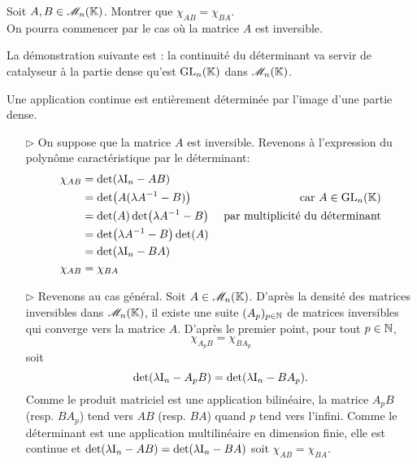 \begin{exercice}
    Soit $A, B \in \mathscr{M}_n(\mathbb{K})$. Montrer que $\chi_{AB}=\chi_{BA}$. \\
    On pourra commencer par le cas où la matrice $A$ est inversible.
\end{exercice}

La démonstration suivante est : la continuité du déterminant va servir de catalyseur à la partie dense qu'est $\mathrm{GL}_n(\mathbb{K})$ dans $\mathscr{M}_n(\mathbb{K})$.
\begin{center}
    Une application continue est entièrement déterminée par l'image d'une partie dense.
\end{center}

\begin{solution}
    \begin{itemize}
    \item[$\rhd$] On suppose que la matrice $A$ est inversible. Revenons à l'expression du polynôme caractéristique par le déterminant:
        \begin{align*}
        \chi_{AB} &= \det(\lambda \mathrm{I}_n - AB) \\
        &= \det(A(\lambda A^{-1} - B)) &\text{car } A \in \mathrm{GL}_n(\mathbb{K}) \\
        &= \det(A) \det(\lambda A^{-1} - B) &\text{ par multiplicité du déterminant} \\
        &= \det(\lambda A^{-1} - B) \det(A) \\
        &= \det(\lambda \mathrm{I}_n - BA) \\
        \chi_{AB} &= \chi_{BA}
    \end{align*}
    \item[$\rhd$] Revenons au cas général. Soit $A \in \mathscr{M}_n(\mathbb{K})$. D'après la densité des matrices inversibles dans $\mathscr{M}_n(\mathbb{K})$, il existe une suite $(A_p)_{p \in \mathbb{N}}$ de matrices inversibles qui converge vers la matrice $A$. D'après le premier point, pour tout $p \in \mathbb{N}$,
    $$\chi_{A_p B} = \chi_{B A_p}$$
    soit 
    $$\det(\lambda \mathrm{I}_n - A_p B) = \det(\lambda \mathrm{I}_n - B A_p).$$
    Comme le produit matriciel est une application bilinéaire, la matrice $A_p B$ (resp. $B A_p$) tend vers $AB$ (resp. $BA$) quand $p$ tend vers l'infini. Comme le déterminant est une application multilinéaire en dimension finie, elle est continue et $\det(\lambda \mathrm{I}_n - A B) = \det(\lambda \mathrm{I}_n - B A)$ soit $\chi_{A B} = \chi_{B A}$. \\
    \end{itemize}
\end{solution}

